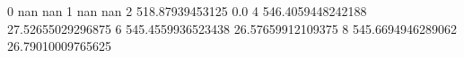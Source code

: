 0 nan nan
1 nan nan
2 518.87939453125 0.0
4 546.4059448242188 27.52655029296875
6 545.4559936523438 26.57659912109375
8 545.6694946289062 26.79010009765625
